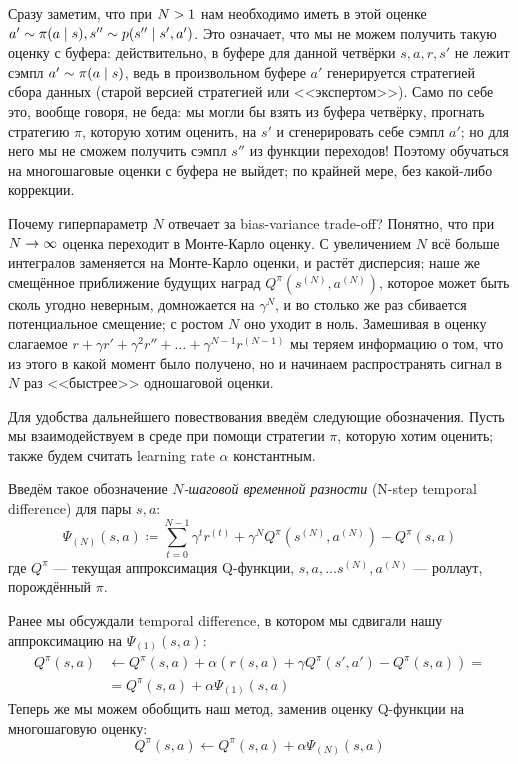Сразу заметим, что при $N \HM> 1$ нам необходимо иметь в этой оценке $a' \HM\sim \pi(a \HM\mid s), s'' \HM\sim p(s'' \mid s', a')$. Это означает, что мы не можем получить такую оценку с буфера: действительно, в буфере для данной четвёрки $s, a, r, s'$ не лежит сэмпл $a' \HM\sim \pi(a \HM\mid s)$, ведь в произвольном буфере $a'$ генерируется стратегией сбора данных (старой версией стратегией или <<экспертом>>). Само по себе это, вообще говоря, не беда: мы могли бы взять из буфера четвёрку, прогнать стратегию $\pi$, которую хотим оценить, на $s'$ и сгенерировать себе сэмпл $a'$; но для него мы не сможем получить сэмпл $s''$ из функции переходов! Поэтому обучаться на многошаговые оценки с буфера не выйдет; по крайней мере, без какой-либо коррекции.

Почему гиперпараметр $N$ отвечает за bias-variance trade-off? Понятно, что при $N \HM\to \infty$ оценка переходит в Монте-Карло оценку. С увеличением $N$ всё больше интегралов заменяется на Монте-Карло оценки, и растёт дисперсия; наше же смещённое приближение будущих наград $Q^{\pi}(s^{(N)}, a^{(N)})$, которое может быть сколь угодно неверным, домножается на $\gamma^N$, и во столько же раз сбивается потенциальное смещение; с ростом $N$ оно уходит в ноль. Замешивая в оценку слагаемое $r + \gamma r' + \gamma^2 r'' + \dots + \gamma^{N-1} r^{(N-1)}$ мы теряем информацию о том, что из этого в какой момент было получено, но и начинаем распространять сигнал в $N$ раз <<быстрее>> одношаговой оценки.

Для удобства дальнейшего повествования введём следующие обозначения. Пусть мы взаимодействуем в среде при помощи стратегии $\pi$, которую хотим оценить; также будем считать learning rate $\alpha$ константным. 
\begin{definition}
Введём такое обозначение \emph{$N$-шаговой временной разности} (N-step temporal difference) для пары $s, a$:
\begin{equation*}
\Psi_{(N)} (s, a) \coloneqq \sum_{t=0}^{N-1} \gamma^{t} r^{(t)} + \gamma^N Q^\pi(s^{(N)}, a^{(N)}) - Q^\pi(s, a)
\end{equation*}
где $Q^{\pi}$ --- текущая аппроксимация Q-функции, $s, a, \dots s^{(N)}, a^{(N)}$ --- роллаут, порождённый $\pi$.
\end{definition}

Ранее мы обсуждали temporal difference, в котором мы сдвигали нашу аппроксимацию на $\Psi_{(1)}(s, a)$:
\begin{align*}
Q^{\pi}(s, a) &\leftarrow Q^{\pi}(s, a) + \alpha (r(s, a) + \gamma Q^{\pi}(s', a') - Q^{\pi}(s, a)) = \\ &= Q^{\pi}(s, a) + \alpha \Psi_{(1)}(s, a)
\end{align*}
Теперь же мы можем обобщить наш метод, заменив оценку Q-функции на многошаговую оценку:
$$Q^{\pi}(s, a) \leftarrow Q^{\pi}(s, a) + \alpha \Psi_{(N)}(s, a)$$

